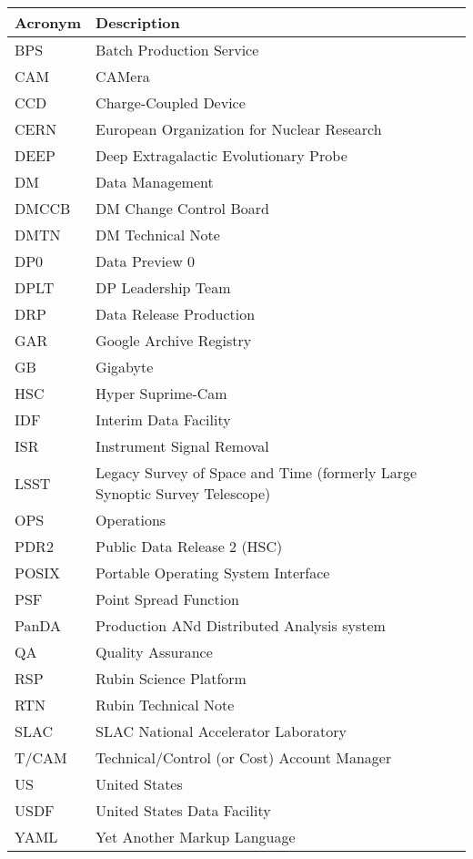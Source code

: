 \addtocounter{table}{-1}
\begin{longtable}{p{}p{}}\hline
\textbf{Acronym} & \textbf{Description}  \\\hline

BPS & Batch Production Service \\\hline
CAM & CAMera \\\hline
CCD & Charge-Coupled Device \\\hline
CERN & European Organization for Nuclear Research \\\hline
DEEP & Deep Extragalactic Evolutionary Probe \\\hline
DM & Data Management \\\hline
DMCCB & DM Change Control Board \\\hline
DMTN & DM Technical Note \\\hline
DP0 & Data Preview 0 \\\hline
DPLT & DP Leadership Team \\\hline
DRP & Data Release Production \\\hline
GAR & Google Archive Registry \\\hline
GB & Gigabyte \\\hline
HSC & Hyper Suprime-Cam \\\hline
IDF & Interim Data Facility \\\hline
ISR & Instrument Signal Removal \\\hline
LSST & Legacy Survey of Space and Time (formerly Large Synoptic Survey Telescope) \\\hline
OPS & Operations \\\hline
PDR2 & Public Data Release 2 (HSC) \\\hline
POSIX & Portable Operating System Interface \\\hline
PSF & Point Spread Function \\\hline
PanDA &  Production ANd Distributed Analysis system \\\hline
QA & Quality Assurance \\\hline
RSP & Rubin Science Platform \\\hline
RTN & Rubin Technical Note \\\hline
SLAC & SLAC National Accelerator Laboratory \\\hline
T/CAM & Technical/Control (or Cost) Account Manager \\\hline
US & United States \\\hline
USDF & United States Data Facility \\\hline
YAML & Yet Another Markup Language \\\hline
\end{longtable}
